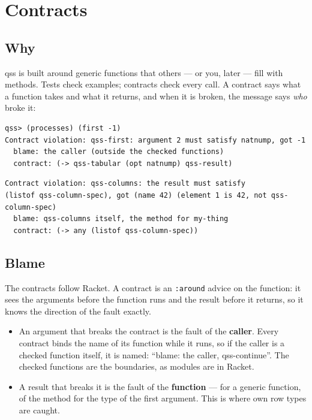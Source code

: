 \documentclass[
  paper=a4, fontsize=11pt, parskip=half, headings=small,
  toc=bibliography, numbers=noenddot, DIV=12
]{scrreprt}
\newcommand{\code}[1]{\texttt{#1}}
\newcommand{\qss}{\textsf{qss}}
\begin{document}
\chapter{Contracts}\label{chap:contracts}

\section{Why}

\qss{} is built around generic functions that others --- or you, later ---
fill with methods. Tests check examples; contracts check every call. A contract
says what a function takes and what it returns, and when it is broken, the
message says \emph{who} broke it:

\begin{Verbatim}
qss> (processes) (first -1)
Contract violation: qss-first: argument 2 must satisfy natnump, got -1
  blame: the caller (outside the checked functions)
  contract: (-> qss-tabular (opt natnump) qss-result)
\end{Verbatim}

\begin{Verbatim}
Contract violation: qss-columns: the result must satisfy
(listof qss-column-spec), got (name 42) (element 1 is 42, not qss-column-spec)
  blame: qss-columns itself, the method for my-thing
  contract: (-> any (listof qss-column-spec))
\end{Verbatim}

\section{Blame}

The contracts follow Racket. A contract is an \code{:around} advice on the
function: it sees the arguments before the function runs and the result before
it returns, so it knows the direction of the fault exactly.

\begin{itemize}
\item An argument that breaks the contract is the fault of the
  \textbf{caller}. Every contract binds the name of its function while it runs,
  so if the caller is a checked function itself, it is named:
  \enquote{blame: the caller, qss-continue}. The checked functions are the
  boundaries, as modules are in Racket.
\item A result that breaks it is the fault of the \textbf{function} --- for a
  generic function, of the method for the type of the first argument. This is
  where own row types are caught.
\end{itemize}
\end{document}

